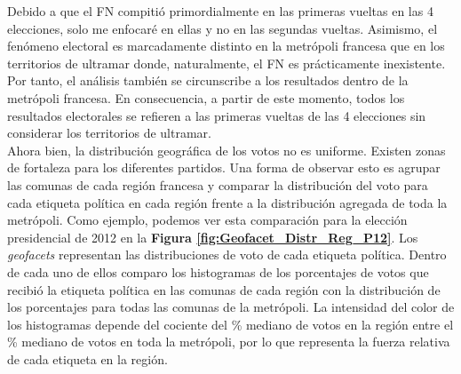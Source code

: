 Debido a que el FN compitió primordialmente en las primeras vueltas en las 4 elecciones, solo me enfocaré en ellas y no en las segundas vueltas. Asimismo, el fenómeno electoral es marcadamente distinto en la metrópoli francesa que en los territorios de ultramar donde, naturalmente, el FN es prácticamente inexistente. Por tanto, el análisis también se circunscribe a los resultados dentro de la metrópoli francesa. En consecuencia, a partir de este momento, todos los resultados electorales se refieren a las primeras vueltas de las 4 elecciones sin considerar los territorios de ultramar.\\

Ahora bien, la distribución geográfica de los votos no es uniforme. Existen zonas de fortaleza para los diferentes partidos. Una forma de observar esto es agrupar las comunas de cada región francesa y comparar la distribución del voto para cada etiqueta política en cada región frente a la distribución agregada de toda la metrópoli. Como ejemplo, podemos ver esta comparación para la elección presidencial de 2012 en la \textbf{Figura \ref{fig:Geofacet_Distr_Reg_P12}}. Los \textit{geofacets} representan las distribuciones de voto de cada etiqueta política. Dentro de cada uno de ellos comparo los histogramas de los porcentajes de votos que recibió la etiqueta política en las comunas de cada región con la distribución de los porcentajes para todas las comunas de la metrópoli. La intensidad del color de los histogramas depende del cociente del \% mediano de votos en la región entre el \% mediano de votos en toda la metrópoli, por lo que representa la fuerza relativa de cada etiqueta en la región.\\


